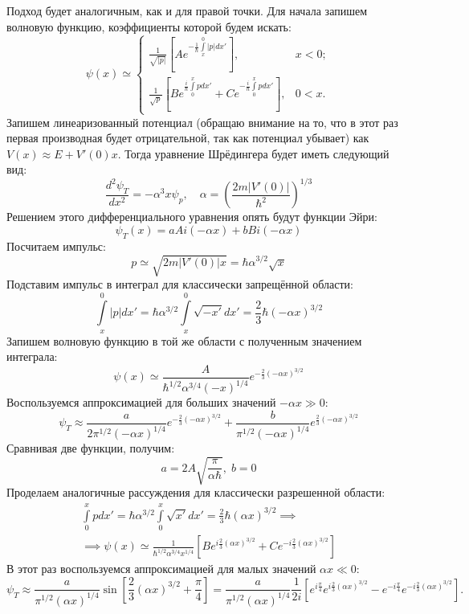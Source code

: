 Подход будет аналогичным, как и для правой точки. Для начала запишем волновую функцию, коэффициенты которой будем искать:
\[
\psi(x) \simeq 
\begin{cases}
     \frac{1}{\sqrt{|p|}}\left[ Ae^{-\frac{1}{\hbar}\int\limits_x^{0} |p| dx'} \right], & x < 0;\\
    \frac{1}{\sqrt{p}}\left[ Be^{\frac{i}{\hbar}\int\limits_{0}^{x} p dx'} + Ce^{-\frac{i}{\hbar}\int\limits_{0}^{x} p dx'} \right], & 0 < x.
\end{cases}
\]
Запишем линеаризованный потенциал (обращаю внимание на то, что в этот раз первая производная будет отрицательной, так как потенциал убывает) как $V(x) \approx E + V'(0)x$. Тогда уравнение Шрёдингера будет иметь следующий вид:
\[
    \frac{d^2\psi_T}{dx^2} = -\alpha^3 x\psi_p, \quad \alpha = \left( \frac{2m|V'(0)|}{\hbar^2} \right)^{1/3}
\]
Решением этого дифференциального уравнения опять будут функции Эйри:
\[
\psi_T(x) = aAi(-\alpha x) + bBi(-\alpha x)
\]
Посчитаем импульс:
\[
p \simeq \sqrt{2m|V'(0)|x} = \hbar\alpha^{3/2}\sqrt{x}
\]
Подставим импульс в интеграл для классически запрещённой области:
\[
\int\limits_{x}^{0} |p| dx' = \hbar\alpha^{3/2} \int\limits_{x}^{0}\sqrt{-x'} dx' = \frac{2}{3}\hbar(-\alpha x)^{3/2}
\]
Запишем волновую функцию в той же области с полученным значением интеграла:
\[
\psi(x) \simeq \frac{A}{\hbar^{1/2}\alpha^{3/4}(-x)^{1/4}} e^{-\frac{2}{3}(-\alpha x)^{3/2}}
\]
Воспользуемся аппроксимацией для больших значений $-\alpha x \gg 0$:
\[
\psi_T \approx \frac{a}{2\pi^{1/2}(-\alpha x)^{1/4}}e^{-\frac{2}{3}(-\alpha x)^{3/2}} + \frac{b}{\pi^{1/2}(-\alpha x)^{1/4}}e^{\frac{2}{3}(-\alpha x)^{3/2}}
\]
Сравнивая две функции, получим:
\[
a = 2A\sqrt{\frac{\pi}{\alpha\hbar}},\; b = 0
\]
Проделаем аналогичные рассуждения для классически разрешенной области:
\begin{gather*}
\int\limits_{0}^{x} p dx' = \hbar\alpha^{3/2} \int\limits_{0}^{x}\sqrt{x'} dx' = \frac{2}{3}\hbar(\alpha x)^{3/2} \implies \\
\implies \psi(x) \simeq \frac{1}{\hbar^{1/2}\alpha^{3/4}x^{1/4}}\left[ Be^{i\frac{2}{3}(\alpha x)^{3/2}} + Ce^{-i\frac{2}{3}(\alpha x)^{3/2}} \right]
\end{gather*}
В этот раз воспользуемся аппроксимацией для малых значений $\alpha x \ll 0$:
\[
\psi_T \approx \frac{a}{\pi^{1/2}(\alpha x)^{1/4}}\sin\left[\frac{2}{3}(\alpha x)^{3/2} + \frac{\pi}{4}\right] = \frac{a}{\pi^{1/2}(\alpha x)^{1/4}}\frac{1}{2i}\left[ e^{i\frac{\pi}{4}}e^{i\frac{2}{3}(\alpha x)^{3/2}} - e^{-i\frac{\pi}{4}}e^{-i\frac{2}{3}(\alpha x)^{3/2}} \right].
\]
